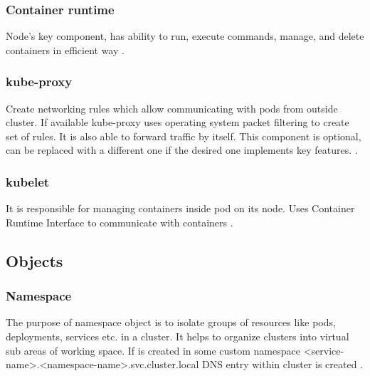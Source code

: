 \subsubsection{Container runtime}
\label{sec:containerRuntime}

Node's key component, has ability to run, execute commands, manage, and delete containers in efficient way \cite{KubernetesArch}. 



\subsubsection{kube-proxy}
\label{sec:kubeProxy}

Create networking rules which allow communicating with pods from outside cluster. If available kube-proxy uses operating system packet filtering to create set of rules. It is also able to forward traffic by itself. This component is optional, can be replaced with a different one if the desired one implements key features. \cite{KubernetesArch}.


\subsubsection{kubelet}
\label{sec:kubelet}

It is responsible for managing containers inside pod on its node. Uses Container Runtime Interface to communicate with containers \cite{KubernetesArch} \cite{KubernetesCRI}.


\subsection{Objects}    
\label{sec:k8s_objects}

\subsubsection{Namespace}
\label{sec:namespace}

The purpose of namespace object is to isolate groups of resources like pods, deployments, services etc. in a cluster. It helps to organize clusters into virtual sub areas of working space. If \textit{} is created in some custom namespace <service-name>.<namespace-name>.svc.cluster.local DNS entry within cluster is created \cite{KubernetesNamespaces}.

